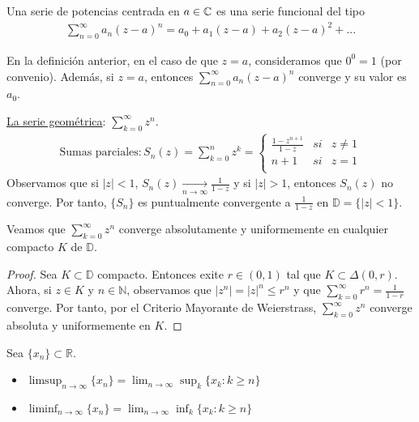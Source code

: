 \begin{defi}
    Una serie de potencias centrada en $a \in \mathbb{C}$ es una serie funcional del tipo
    \begin{align*}
        \sum_{n=0}^{\infty}{a_n(z-a)^n} = a_0 + a_1(z-a) + a_2(z-a)^2 + ...
    \end{align*}
\end{defi}

\begin{obs}
    En la definición anterior, en el caso de que $z = a$, consideramos que $0^0 = 1$ (por convenio). Además, si $z = a$, entonces $\sum_{n=0}^{\infty}{a_n(z-a)^n}$ converge y su valor es $a_0$.
\end{obs}

\begin{ejemplo}
    \underline{La serie geométrica}: $\sum_{k=0}^{\infty}{z^n}$.
    \begin{align*}
        \text{Sumas parciales}: S_n(z) = \sum_{k=0}^{n}{z^k} = \left\{ \begin{array}{lcc}
                                                                           \frac{1-z^{n+1}}{1-z} & si & z \not = 1 \\
                                                                           n+1                   & si & z = 1      \\
                                                                       \end{array}
        \right.
    \end{align*}
    Observamos que si $|z| < 1$, $S_n(z) \xrightarrow[n \to \infty]{} \frac{1}{1-z}$ y si $|z| > 1$, entonces $S_n(z)$ no converge. Por tanto, $\{S_n\}$ es puntualmente convergente a $\frac{1}{1-z}$ en $\mathbb{D} = \{|z| < 1\}$.

    Veamos que $\sum_{k=0}^{\infty}{z^n}$ converge absolutamente y uniformemente en cualquier compacto $K$ de $\mathbb{D}$.
    \begin{proof}
        Sea $K \subset \mathbb{D}$ compacto. Entonces exite $r \in (0,1)$ tal que $K \subset \Delta(0,r)$. Ahora, si $z \in K$ y $n \in \mathbb{N}$, observamos que $|z^n| = |z|^n \leq r^n$ y que $\sum_{k=0}^{\infty}{r^n} = \frac{1}{1-r}$ converge. Por tanto, por el Criterio Mayorante de Weierstrass, $\sum_{k=0}^{\infty}{z^n}$ converge absoluta y uniformemente en $K$.
    \end{proof}
\end{ejemplo}

\begin{defi}
    Sea $\{x_n\} \subset \mathbb{R}$.
    \begin{itemize}
        \item $\limsup_{n \to \infty}{\{x_n\}} = \lim_{n \to \infty}{\sup_{k}{\{x_k : k \ge n \}}}$
        \item $\liminf_{n \to \infty}{\{x_n\}} = \lim_{n \to \infty}{\inf_{k}{\{x_k : k \ge n \}}}$
    \end{itemize}
\end{defi}

